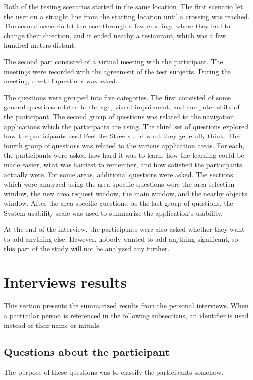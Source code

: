 \documentclass[nolof,digital]{fithesis3}
\begin{document}
Both of the testing scenarios started in the same location. The first scenario let the user on a straight line from the starting location until a crossing was reached. The second scenario let the user through a few crossings where they had to change their direction, and it ended nearby a restaurant, which was a few hundred meters distant.

The second part consisted of a virtual meeting with the participant. The meetings were recorded with the agreement of the test subjects. During the meeting, a set of questions was asked.

The questions were grouped into five categories. The first consisted of some general questions related to the age, visual impairment, and computer skills of the participant. The second group of questions was related to the navigation applications which the participants are using. The third set of questions explored how the participants used Feel the Streets and what they generally think. The fourth group of questions was related to the various application areas. For each, the participants were asked how hard it was to learn, how the learning could be made easier, what was hardest to remember, and how satisfied the participants actually were. For some areas, additional questions were asked. The sections which were analyzed using the area-specific questions were the area selection window, the new area request window, the main window, and the nearby objects window. After the area-specific questions, as the last group of questions, the System usability scale \parencite{brooke1996} was used to summarize the application's usability.

At the end of the interview, the participants were also asked whether they want to add anything else. However, nobody wanted to add anything significant, so this part of the study will not be analyzed any further.
\section{Interviews results}
This section presents the summarized results from the personal interviews. When a particular person is referenced in the following subsections, an identifier is used instead of their name or initials.
\subsection{Questions about the participant}
The purpose of these questions was to classify the participants somehow.
\end{document}
